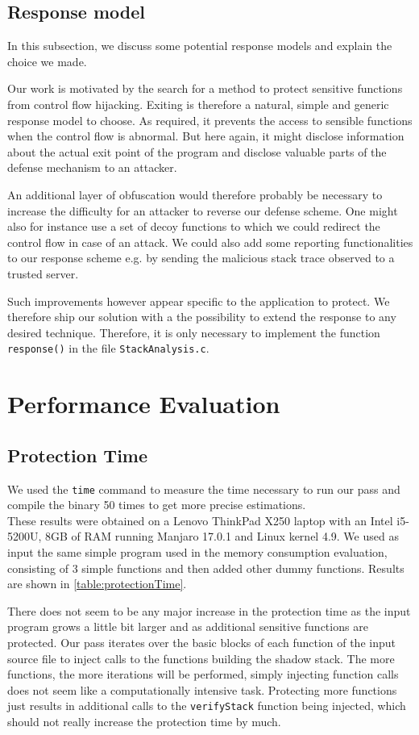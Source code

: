 \documentclass{llncs}
\begin{document}
\subsection{Response model}
In this subsection, we discuss some potential response models and explain the choice we made.

Our work is motivated by the search for a method to protect sensitive functions from control flow hijacking. Exiting is therefore a natural, simple and generic response model to choose. As required, it prevents the access to sensible functions when the control flow is abnormal. But here again, it might disclose information about the actual exit point of the program and disclose valuable parts of the defense mechanism to an attacker.

An additional layer of obfuscation would therefore probably be necessary to increase the difficulty for an attacker to reverse our defense scheme. One might also for instance use a set of decoy functions to which we could redirect the control flow in case of an attack. We could also add some reporting functionalities to our response scheme e.g. by sending the malicious stack trace observed to a trusted server.

Such improvements however appear specific to the application to protect. We therefore ship our solution with a the possibility to extend the response to any desired technique. Therefore, it is only necessary to implement the function \texttt{response()} in the file \texttt{StackAnalysis.c}.

\section{Performance Evaluation}

\subsection{Protection Time}
We used the \texttt{time} command to measure the time necessary to run our pass and compile the binary 50 times to get more precise estimations.\\
These results were obtained on a Lenovo ThinkPad X250 laptop with an Intel i5-5200U, 8GB of RAM running Manjaro 17.0.1 and Linux kernel 4.9.
We used as input the same simple program used in the memory consumption evaluation, consisting of 3 simple functions and then added other dummy functions. Results are shown in \autoref{table:protectionTime}.

There does not seem to be any major increase in the protection time as the input program grows a little bit larger and as additional sensitive functions are protected. Our pass iterates over the basic blocks of each function of the input source file to inject calls to the functions building the shadow stack. The more functions, the more iterations will be performed, simply injecting function calls does not seem like a computationally intensive task. Protecting more functions just results in additional calls to the \texttt{verifyStack} function being injected, which should not really increase the protection time by much.
\end{document}
